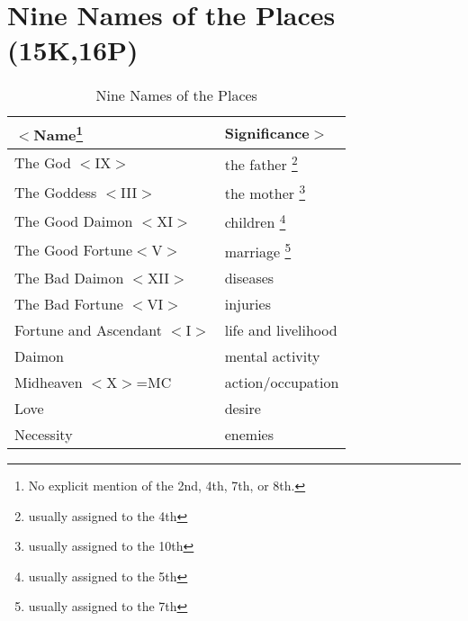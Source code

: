 \section{Nine Names of the Places (15K,16P)}

\begin{table}[ht]
\begin{center}
\caption{Nine Names of the Places}
\label{Table 2.1}
\vspace{0.5cm}
\begin{tabular}{ll}
\hline
\textbf{$<$Name}\footnote{No explicit mention of the 2nd, 4th, 7th, or 8th.}
			& \textbf{Significance$>$}	\\
\hline
The God $<$IX$>$ 			& the father
						\footnote{usually assigned to the 4th}		\\
The Goddess $<$III$>$		& the mother
						\footnote{usually assigned to the 10th}	\\
The Good Daimon $<$XI$>$	& children
						\footnote{usually assigned to the 5th}		\\
The Good Fortune$<$V$>$	& marriage
						\footnote{usually assigned to the 7th}		\\
The Bad Daimon $<$XII$>$	& diseases			\\
The Bad Fortune $<$VI$>$	& injuries			\\
\parbox{4.5cm}{
Fortune and Ascendant 
$<$I$>$}						& life and livelihood	\\
Daimon							& mental activity		\\
Midheaven $<$X$>$=MC		& action/occupation		\\
Love							& desire					\\
Necessity						& enemies					\\
\hline
\end{tabular}
\end{center}
\end{table}

\newpage